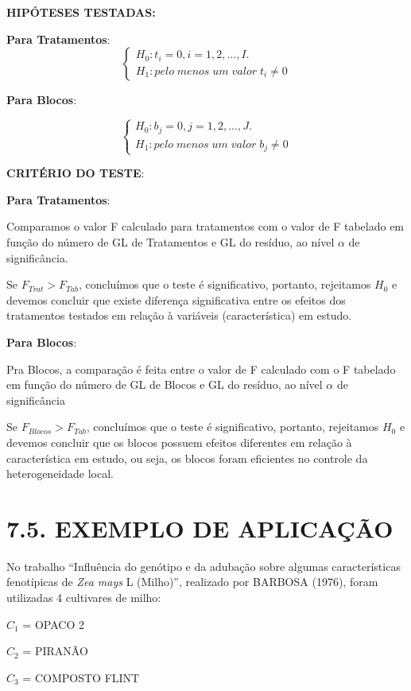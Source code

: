 \documentclass[
]{book}
\begin{document}
\textbf{HIPÓTESES TESTADAS:}

\textbf{Para Tratamentos}:
\[
\begin{cases} H_0: t_i=0, i=1,2, ...,I. \\
H_1:pelo\;menos\;um \;valor\;t_i \neq 0
\end{cases}
\]

\textbf{Para Blocos}:

\[
\begin{cases} H_0: b_j=0, j=1,2, ...,J. \\
H_1:pelo\;menos\;um \;valor\;b_j \neq 0
\end{cases}
\]

\textbf{CRITÉRIO DO TESTE}:

\textbf{Para Tratamentos}:

Comparamos o valor F calculado para tratamentos com o valor de F tabelado em função do número de GL de Tratamentos e GL do resíduo, ao nível \(\alpha\) de significância.

Se \(F_{Trat} > F_{Tab}\), concluímos que o teste é significativo, portanto, rejeitamos \(H_0\) e devemos concluir que existe diferença significativa entre os efeitos dos tratamentos testados em relação à variáveis (característica) em estudo.

\textbf{Para Blocos}:

Pra Blocos, a comparação é feita entre o valor de F calculado com o F tabelado em função do número de GL de Blocos e GL do resíduo, ao nível \(\alpha\) de significância

Se \(F_{Blocos} > F_{Tab}\), concluímos que o teste é significativo, portanto, rejeitamos \(H_0\) e devemos concluir que os blocos possuem efeitos diferentes em relação à característica em estudo, ou seja, os blocos foram eficientes no controle da heterogeneidade local.

\hypertarget{exemplo-de-aplicauxe7uxe3o}{%
\section{7.5. EXEMPLO DE APLICAÇÃO}\label{exemplo-de-aplicauxe7uxe3o}}

No trabalho ``Influência do genótipo e da adubação sobre algumas características fenotípicas de \emph{Zea mays} L (Milho)'', realizado por BARBOSA (1976), foram utilizadas 4 cultivares de milho:

\(C_1\) = OPACO 2

\(C_2\) = PIRANÃO

\(C_3\) = COMPOSTO FLINT
\end{document}
